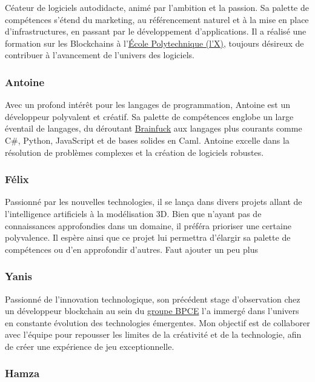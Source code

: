 \documentclass[
	article,			%
	11pt,				%
	oneside,			%
	a4paper,			%
	chapter=TITLE,
	french,			%
	sumario=tradicional
	]{base_nt}
\begin{document}
Céateur de logiciels autodidacte, animé par l'ambition et la passion. Sa palette de compétences s'étend du marketing, au référencement naturel et à la mise en place d'infrastructures, en passant par le développement d'applications. Il a réalisé une formation sur les Blockchains à l'\href{https://fr.wikipedia.org/wiki/%C3%89cole_polytechnique_(France)}{École Polytechnique (l'X)}, toujours désireux de contribuer à l'avancement de l'univers des logiciels.

\subsubsection{Antoine}

Avec un profond intérêt pour les langages de programmation, Antoine est un développeur polyvalent et créatif. Sa palette de compétences englobe un large éventail de langages, du déroutant \href{https://fr.wikipedia.org/wiki/Brainfuck}{Brainfuck} aux langages plus courants comme C\#, Python, JavaScript et de bases solides en Caml. Antoine excelle dans la résolution de problèmes complexes et la création de logiciels robustes.

\subsubsection{Félix}

Passionné par les nouvelles technologies, il se lança dans divers projets allant de l’intelligence artificiels à la modélisation 3D. Bien que n’ayant pas de connaissances approfondies dans un domaine, il préféra prioriser une certaine polyvalence. Il espère ainsi que ce projet lui permettra d’élargir sa palette de compétences ou d’en approfondir d’autres. Faut ajouter un peu plus

\newpage
\subsubsection{Yanis}

Passionné de l'innovation technologique, son précédent stage d'observation chez un développeur blockchain au sein du \href{https://fr.wikipedia.org/wiki/BPCE}{groupe BPCE} l'a immergé dans l'univers en constante évolution des technologies émergentes. Mon objectif est de collaborer avec l'équipe pour repousser les limites de la créativité et de la technologie, afin de créer une expérience de jeu exceptionnelle.

\subsubsection{Hamza}
\end{document}
